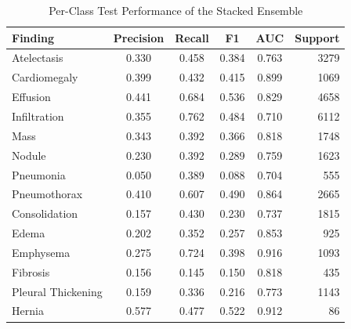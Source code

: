 \begin{table}[t]
\caption{Per-Class Test Performance of the Stacked Ensemble}
\label{tab:perclass}
\centering
\footnotesize
\setlength{\tabcolsep}{4pt}
\begin{tabular}{lccccr}
\toprule
Finding & Precision & Recall & F1 & AUC & Support \\
\midrule
Atelectasis & 0.330 & 0.458 & 0.384 & 0.763 & 3279 \\
Cardiomegaly & 0.399 & 0.432 & 0.415 & 0.899 & 1069 \\
Effusion & 0.441 & 0.684 & 0.536 & 0.829 & 4658 \\
Infiltration & 0.355 & 0.762 & 0.484 & 0.710 & 6112 \\
Mass & 0.343 & 0.392 & 0.366 & 0.818 & 1748 \\
Nodule & 0.230 & 0.392 & 0.289 & 0.759 & 1623 \\
Pneumonia & 0.050 & 0.389 & 0.088 & 0.704 & 555 \\
Pneumothorax & 0.410 & 0.607 & 0.490 & 0.864 & 2665 \\
Consolidation & 0.157 & 0.430 & 0.230 & 0.737 & 1815 \\
Edema & 0.202 & 0.352 & 0.257 & 0.853 & 925 \\
Emphysema & 0.275 & 0.724 & 0.398 & 0.916 & 1093 \\
Fibrosis & 0.156 & 0.145 & 0.150 & 0.818 & 435 \\
Pleural Thickening & 0.159 & 0.336 & 0.216 & 0.773 & 1143 \\
Hernia & 0.577 & 0.477 & 0.522 & 0.912 & 86 \\
\bottomrule
\end{tabular}
\end{table}
